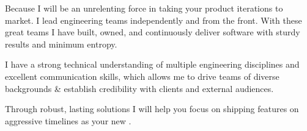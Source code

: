 Because I will be an unrelenting force in taking your product iterations to market. I lead engineering teams independently and from the front. With these great teams I have built, owned, and continuously deliver software with sturdy results and minimum entropy.

I have a strong technical understanding of multiple engineering disciplines and excellent communication skills, which allows me to drive teams of diverse backgrounds \& establish credibility with clients and external audiences. 

Through robust, lasting solutions I will help you focus on shipping features on aggressive timelines as your new \jobTitle.